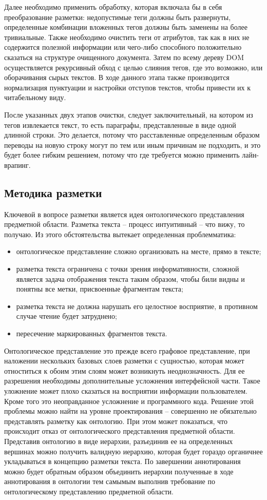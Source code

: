 \documentclass[../main]{subfiles}
\begin{document}
Далее необходимо применить обработку, которая включала бы в себя преобразование разметки: недопустимые теги должны быть развернуты, определенные комбинации вложенных тегов должны быть заменены на более тривиальные. Также необходимо очистить теги от атрибутов, так как в них не содержится полезной информации или чего-либо способного положительно сказаться на структуре очищенного документа. Затем по всему дереву DOM осуществляется рекурсивный обход с целью слияния тегов, где это возможно, или оборачивания сырых текстов. В ходе данного этапа также производится нормализация пунктуации и настройки отступов текстов, чтобы привести их к читабельному виду. 

После указанных двух этапов очистки, следует заключительный, на котором из тегов извлекается текст, то есть параграфы, представленные в виде одной длинной строки. Это делается, потому что расставленные определенным образом переводы на новую строку могут по тем или иным причинам не подходить, и это будет более гибким решением, потому что где требуется можно применить лайн-врапинг.

\subsection{Методика разметки}
Ключевой в вопросе разметки является идея онтологического представления предметной области. Разметка текста -- процесс интуитивный -- что вижу, то получаю. Из этого обстоятельства вытекает определенная проблемматика:

\begin{itemize}
\item онтологическое представление сложно организовать на месте, прямо в тексте;
\item разметка текста ограничена с точки зрения информативности, сложной является задача отображения текста таким образом, чтобы били видны и понятны все метки, присвоенные фрагментам текста;
\item разметка текста не должна нарушать его целостное восприятие, в противном случае чтение будет затруднено;
\item пересечение маркированных фрагментов текста.
\end{itemize}

Онтологическое представление это прежде всего графовое представление, при наложении нескольких базовых слоев разметки с сущностью, которая может отноститься к обоим этим слоям может возникнуть неоднозначность. Для ее разрешения необходимы дополнительные усложнения интерфейсной части. Такое уложнение может плохо сказаться на восприятии информации пользователем. Кроме того это неоправданное усложнение и программного кода. Решение этой проблемы можно найти на уровне проектирования -- совершенно не обязательно представлять разметку как онтологию. При этом может показаться, что происходит отказ от онтологического представления предметной области. Представив онтологию в виде иерархии, разъединив ее на определенных вершинах можно получить валидную иерархию, которая будет гораздо органичнее укладываться в концепцию разметки текста. По завершении аннотирования можно будет обратным образом объединить иерархии полученные в ходе аннотирования в онтологии тем самымым выполнив требование по онтологическому представлению предметной области.
\end{document}
